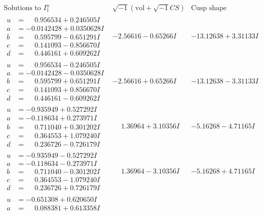 \documentclass[1p]{elsarticle_modified}
\theoremstyle{definition}
\newcommand{\I}{\sqrt{-1}}
\begin{document}
$$\begin{array}{c|c|c}  
\text{Solutions to }I^u_{1}& \I (\text{vol} + \sqrt{-1}CS) & \text{Cusp shape}\\
 \hline 
\begin{aligned}
u &= \phantom{-}0.956534 + 0.246505 I \\
a &= -0.0142428 + 0.0350628 I \\
b &= \phantom{-}0.595799 - 0.651291 I \\
c &= \phantom{-}0.141093 - 0.856670 I \\
d &= \phantom{-}0.446161 + 0.609262 I\end{aligned}
 & -2.56616 - 0.65266 I & -13.12638 + 3.31133 I \\ \hline\begin{aligned}
u &= \phantom{-}0.956534 - 0.246505 I \\
a &= -0.0142428 - 0.0350628 I \\
b &= \phantom{-}0.595799 + 0.651291 I \\
c &= \phantom{-}0.141093 + 0.856670 I \\
d &= \phantom{-}0.446161 - 0.609262 I\end{aligned}
 & -2.56616 + 0.65266 I & -13.12638 - 3.31133 I \\ \hline\begin{aligned}
u &= -0.935949 + 0.527292 I \\
a &= -0.118634 + 0.273971 I \\
b &= \phantom{-}0.711040 + 0.301202 I \\
c &= \phantom{-}0.364553 + 1.079240 I \\
d &= \phantom{-}0.236726 - 0.726179 I\end{aligned}
 & \phantom{-}1.36964 + 3.10356 I & -5.16268 - 4.71165 I \\ \hline\begin{aligned}
u &= -0.935949 - 0.527292 I \\
a &= -0.118634 - 0.273971 I \\
b &= \phantom{-}0.711040 - 0.301202 I \\
c &= \phantom{-}0.364553 - 1.079240 I \\
d &= \phantom{-}0.236726 + 0.726179 I\end{aligned}
 & \phantom{-}1.36964 - 3.10356 I & -5.16268 + 4.71165 I \\ \hline\begin{aligned}
u &= -0.651308 + 0.620650 I \\
a &= \phantom{-}0.088381 + 0.613358 I \\

\end{aligned}
\end{array}$$
\end{document}
